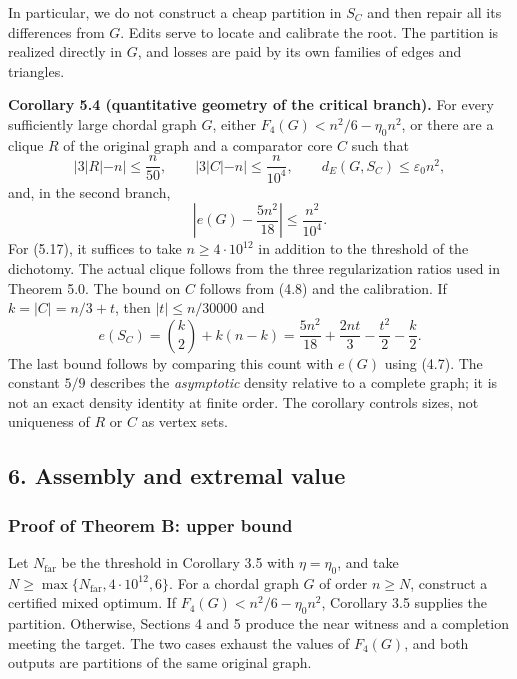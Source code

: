 \documentclass[english,11pt,a4paper]{article}
\begin{document}
In particular, we do not construct a cheap partition in \(S_C\) and then repair all its differences from \(G\). Edits serve to locate and calibrate the root. The partition is realized directly in \(G\), and losses are paid by its own families of edges and triangles.


\textbf{Corollary 5.4 (quantitative geometry of the critical branch).} For every sufficiently large chordal graph \(G\), either \(F_4(G)<n^2/6-\eta_0n^2\), or there are a clique \(R\) of the original graph and a comparator core \(C\) such that \[
|3|R|-n|\le\frac n{50},\qquad
|3|C|-n|\le\frac n{10^4},\qquad
d_E(G,S_C)\le\varepsilon_0n^2,
\tag{5.17}
\] and, in the second branch, \[
\left|e(G)-\frac{5n^2}{18}\right|\le\frac{n^2}{10^4}.
\tag{5.18}
\] For (5.17), it suffices to take \(n\ge4\cdot10^{12}\) in addition to the threshold of the dichotomy. The actual clique follows from the three regularization ratios used in Theorem 5.0. The bound on \(C\) follows from (4.8) and the calibration. If \(k=|C|=n/3+t\), then \(|t|\le n/30000\) and \[
e(S_C)=\binom k2+k(n-k)
=\frac{5n^2}{18}+\frac{2nt}{3}-\frac{t^2}{2}-\frac{k}{2}.
\] The last bound follows by comparing this count with \(e(G)\) using (4.7). The constant \(5/9\) describes the \emph{asymptotic} density relative to a complete graph; it is not an exact density identity at finite order. The corollary controls sizes, not uniqueness of \(R\) or \(C\) as vertex sets.

\subsection{6. Assembly and extremal value}\label{assembly-and-extremal-value}

\subsubsection{Proof of Theorem B: upper bound}\label{proof-of-theorem-b-upper-bound}

Let \(N_{\mathrm{far}}\) be the threshold in Corollary 3.5 with \(\eta=\eta_0\), and take \(N\ge\max\{N_{\mathrm{far}},4\cdot10^{12},6\}\). For a chordal graph \(G\) of order \(n\ge N\), construct a certified mixed optimum. If \(F_4(G)<n^2/6-\eta_0n^2\), Corollary 3.5 supplies the partition. Otherwise, Sections 4 and 5 produce the near witness and a completion meeting the target. The two cases exhaust the values of \(F_4(G)\), and both outputs are partitions of the same original graph.
\end{document}
